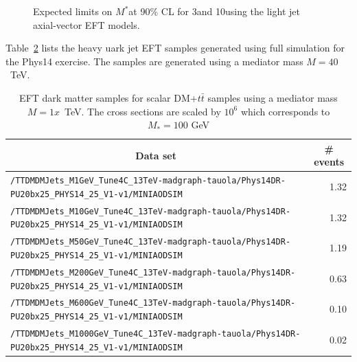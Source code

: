 \begin{table}[h!]
\begin{figure}[h!]
  \centering
  \caption{\label{fig:MJ_EFT_limit} Expected limits on $M^*$at 90\% CL for 3\fbinv and 10\fbinv using the light jet axial-vector EFT models. }
\end{figure}



\clearpage


Table~\ref{tab:datasets_dmtt} lists the heavy uark jet EFT samples generated using full simulation for the Phys14 exercise. The samples are generated using a mediator mass $M=40$~TeV.

\begin{table}
    \centering
    \caption{EFT dark matter samples for scalar DM+$t\bar{t}$ samples using a mediator mass $M=1x$~TeV. The cross sections are scaled by $10^6$ which corresponds to $M_*=100$ GeV \label{tab:datasets_dmtt}}
    \begin{tabular}{lr}
      \hline\hline
      \multicolumn{1}{c}{Data set}&\multicolumn{1}{c}{\# events}\tabularnewline
      \hline
      {\footnotesize \verb!/TTDMDMJets_M1GeV_Tune4C_13TeV-madgraph-tauola/Phys14DR- PU20bx25_PHYS14_25_V1-v1/MINIAODSIM!}   & 1.32 \tabularnewline
      {\footnotesize \verb!/TTDMDMJets_M10GeV_Tune4C_13TeV-madgraph-tauola/Phys14DR- PU20bx25_PHYS14_25_V1-v1/MINIAODSIM!}  & 1.32 \tabularnewline
      {\footnotesize \verb!/TTDMDMJets_M50GeV_Tune4C_13TeV-madgraph-tauola/Phys14DR- PU20bx25_PHYS14_25_V1-v1/MINIAODSIM!}  & 1.19 \tabularnewline
      {\footnotesize \verb!/TTDMDMJets_M200GeV_Tune4C_13TeV-madgraph-tauola/Phys14DR- PU20bx25_PHYS14_25_V1-v1/MINIAODSIM!} & 0.63 \tabularnewline
      {\footnotesize \verb!/TTDMDMJets_M600GeV_Tune4C_13TeV-madgraph-tauola/Phys14DR- PU20bx25_PHYS14_25_V1-v1/MINIAODSIM!} & 0.10 \tabularnewline
      {\footnotesize \verb!/TTDMDMJets_M1000GeV_Tune4C_13TeV-madgraph-tauola/Phys14DR- PU20bx25_PHYS14_25_V1-v1/MINIAODSIM!}& 0.02 \tabularnewline
      \hline \hline
\end{tabular}
\end{table}


\end{table}
